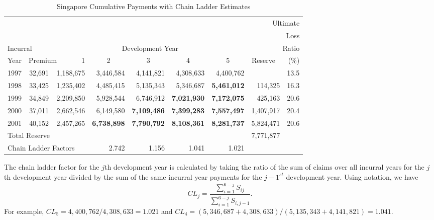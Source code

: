 \begin{center}  \begin{table}[h]
\caption{\label{T19:SingaporeBasicChainLadder} Singapore Cumulative Payments with Chain Ladder Estimates}
\begin{tabular}{lrrrrrrrr}
 \hline
 \multicolumn{9}{r}{Ultimate}\\
  \multicolumn{9}{r}{Loss }\\
\multicolumn{2}{l}{Incurral }  &\multicolumn{5}{c}{Development Year }  & \multicolumn{2}{r}{Ratio}   \\
Year &  \multicolumn{2}{l}{Premium~~~~~~~1} & \multicolumn{1}{c}{2} &  \multicolumn{1}{c}{3}& \multicolumn{1}{c}{4}&    \multicolumn{1}{c}{5}&    \multicolumn{2}{r}{Reserve~~~ (\%)} \\
\hline
1997 &     32,691 &  1,188,675 &  3,446,584 &  4,141,821 &  4,308,633 &  4,400,762 &            &       13.5 \\
\cline{7-7}1998 &     33,425 &  1,235,402 &  4,485,415 &  5,135,343 &  5,346,687 & {\bf 5,461,012} &    114,325 &       16.3 \\
\cline{6-6}1999 &     34,849 &  2,209,850 &  5,928,544 &  6,746,912 & \multicolumn{1}{r}{\bf 7,021,930} &  {\bf 7,172,075} &    425,163 &       20.6 \\
\cline{5-5}2000 &     37,011 &  2,662,546 &  6,149,580 & {\bf 7,109,486} & {\bf 7,399,283} & {\bf 7,557,497} &  1,407,917 &       20.4 \\
\cline{4-4}2001 &     40,152 &  2,457,265 &{\bf 6,738,898} & {\bf 7,790,792} & {\bf 8,108,361} & {\bf 8,281,737} &  5,824,471 &       20.6 \\
\hline
\multicolumn{3}{l}{Total Reserve}        &       &    &       &       & 7,771,877 \\
\multicolumn{3}{l}{Chain Ladder Factors} &       2.742 &      1.156 &      1.041 &      1.021 &  \\
 \hline
\end{tabular}
\end{table}  \end{center}

The chain ladder factor for the $j$th development year is calculated
by taking the ratio of the sum of claims over all incurral years for
the $j$th development year divided by the sum of the same incurral
year payments for the  $j-1^{st}$ development year. Using notation,
we have
\begin{equation*}
CL_j = \frac {\sum_{i=1}^{6-j} S_{ij}}{\sum_{i=1}^{6-j} S_{i,j-1}}.
\end{equation*}
For example, $CL_5 = 4,400,762/4,308,633 = 1.021 $ and $CL_4 =
(5,346,687+4,308,633)/(5,135,343+4,141,821)= 1.041 $.

